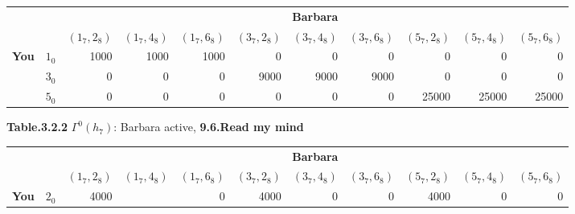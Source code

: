 \documentclass{article}
\begin{document}
\begin{description}
    \begin{center}
            \begin{tabular}{rrrrrrrrrrr}
            \hline
            \hline
                       &            &                                                                                 \multicolumn{ 9}{c}{{\bf Barbara}} \\

                       &            &  $(1_7,2_8)$ &  $(1_7,4_8)$ &  $(1_7,6_8)$ &  $(3_7,2_8)$ &  $(3_7,4_8)$ &  $(3_7,6_8)$ &  $(5_7,2_8)$ &  $(5_7,4_8)$ &  $(5_7,6_8)$ \\
            \hline
            \multicolumn{ 1}{c}{{\bf You}} &        $1_0$ &       1000 &       1000 &       1000 &          0 &          0 &          0 &          0 &          0 &          0 \\

            \multicolumn{ 1}{c}{{\bf }} &        $3_0$ &          0 &          0 &          0 &       9000 &       9000 &       9000 &          0 &          0 &          0 \\

            \multicolumn{ 1}{c}{{\bf }} &        $5_0$ &          0 &          0 &          0 &          0 &          0 &          0 &      25000 &      25000 &      25000 \\
            \hline
            \hline
            \end{tabular}

         {\bf Table.3.2.2 }$\Gamma ^0(h_7)$: Barbara active, {\bf 9.6.Read my mind}
    \end{center}

    \begin{center}
        \begin{tabular}{rrrrrrrrrrr}
        \hline
        \hline
                   &            &                                                                                 \multicolumn{ 9}{c}{{\bf Barbara}} \\

                   &            &  $(1_7,2_8)$ &  $(1_7,4_8)$ &  $(1_7,6_8)$ &  $(3_7,2_8)$ &  $(3_7,4_8)$ &  $(3_7,6_8)$ &  $(5_7,2_8)$ &  $(5_7,4_8)$ &  $(5_7,6_8)$ \\
        \hline
        \multicolumn{ 1}{c}{{\bf You}} &        $2_0$ &       4000 &            &          0 &       4000 &          0 &          0 &       4000 &          0 &          0 \\


\end{tabular}
\end{center}
\end{description}
\end{document}
